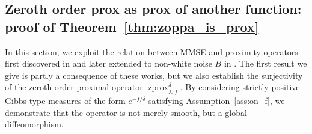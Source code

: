 \documentclass{article}
\newcommand{\zprox}{\ensuremath{\operatorname{zprox}}}
\begin{document}
\subsection{Zeroth order prox as prox of another function: proof of Theorem~\ref{thm:zoppa_is_prox}}\label{app:proof_of_zoppa_is_prox}

In this section, we exploit the relation between MMSE and proximity operators first discovered in \cite{Gribonval11} and later extended to non-white noise $B$ in \cite{Gribonval2013}. The first result we give is partly a consequence of these works, but we also establish the surjectivity of the zeroth-order proximal operator $\zprox_{\lambda,f}^\delta$. By considering strictly positive Gibbs-type measures of the form $e^{-f/\delta}$ satisfying Assumption~\ref{ass:on_f}, we demonstrate that the operator is not merely smooth, but a global diffeomorphism.
\end{document}
